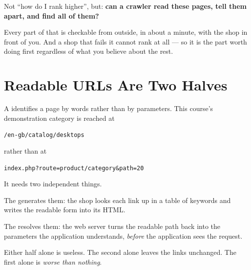 \begin{conceptbox}
Not ``how do I rank higher'', but: \textbf{can a crawler read these pages, tell
them apart, and find all of them?}

\smallskip
Every part of that is checkable from outside, in about a minute, with the shop
in front of you. And a shop that fails it cannot rank at all --- so it is the
part worth doing first regardless of what you believe about the rest.
\end{conceptbox}

\section{Readable URLs Are Two Halves}

\begin{definitionbox}
A  identifies a page by words rather than by parameters.
This course's demonstration category is reached at

\smallskip
\hspace*{1em}\texttt{/en-gb/catalog/desktops}

\smallskip
\noindent rather than at

\smallskip
\hspace*{1em}\texttt{index.php?route=product/category\&path=20}

\smallskip
It needs two independent things.

\smallskip
The  generates them: the shop looks each link up in a
table of keywords and writes the readable form into its HTML.

\smallskip
The  resolves them: the web server turns the readable path
back into the parameters the application understands, \emph{before} the
application sees the request.

\smallskip
Either half alone is useless. The second alone leaves the links unchanged. The
first alone is \emph{worse than nothing}.
\end{definitionbox}

